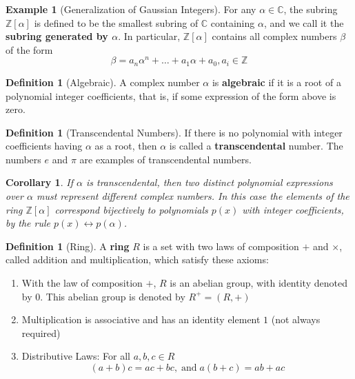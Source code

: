\documentclass[12pt]{article}
\newtheorem{cor}[thm]{Corollary}
\theoremstyle{definition}
\newtheorem{defn}[thm]{Definition}
\newtheorem{eg}[thm]{Example}
\theoremstyle{remark}
\numberwithin{equation}{section}
\newcommand\C{\mathbb C}    %
\newcommand\Z{\mathbb Z}    %
\newcommand\B[1]{\textbf{ #1}}
\begin{document}
\vspace{15pt}

\begin{eg}[Generalization of Gaussian Integers]
        For any $\alpha \in \C$, the subring $\Z[\alpha]$ is defined to be the smallest subring of $\C$ containing $\alpha$, and we call it the \B{subring generated by $\alpha$}. In particular, $\Z[\alpha]$ contains all complex numbers $\beta$ of the form \begin{equation}
                \beta = a_n\alpha^n + \hdots + a_1\alpha + a_0, a_i \in \Z
        \end{equation}
\end{eg}

\vspace{15pt}

\begin{defn}[Algebraic]
        A complex number $\alpha$ is \B{algebraic} if it is a root of a polynomial integer coefficients, that is, if some expression of the form above is zero. 
\end{defn}


\vspace{15pt}

\begin{defn}[Transcendental Numbers]
        If there is no polynomial with integer coefficients having $\alpha$ as a root, then $\alpha$ is called a \B{transcendental} number. The numbers $e$ and $\pi$ are examples of transcendental numbers.
\end{defn}

\vspace{15pt}

\begin{cor}
        If $\alpha$ is transcendental, then two distinct polynomial expressions over $\alpha$ must represent different complex numbers. In this case the elements of the ring $\Z[\alpha]$ correspond bijectively to polynomials $p(x)$ with integer coefficients, by the rule $p(x) \leftrightarrow p(\alpha)$.
\end{cor}


\vspace{15pt}

\begin{defn}[Ring]
        A \B{ring} $R$ is a set with two laws of composition $+$ and $\times$, called addition and multiplication, which satisfy these axioms: \begin{enumerate}
                \item With the law of composition $+$, $R$ is an abelian group, with identity denoted by $0$. This abelian group is denoted by $R^+=(R,+)$
                \item Multiplication is associative and has an identity element $1$ (not always required)
                \item Distributive Laws: For all $a,b,c \in R$\begin{equation}
                                (a+b)c = ac+bc, \;\text{and}\;a(b+c) = ab+ac
                \end{equation}
        \end{enumerate}
\end{defn}
\end{document}
